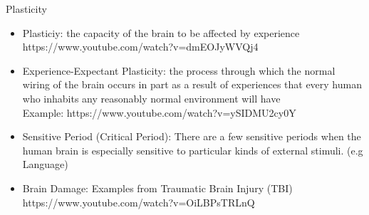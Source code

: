\documentclass{beamer} %
\begin{document}
\begin{frame}{Plasticity}
\begin{itemize}
    \item Plasticiy: the capacity of the brain to be affected by experience
    \\ https://www.youtube.com/watch?v=dmEOJyWVQj4
    \item Experience-Expectant Plasticity: the process through which the normal wiring of the brain occurs in part as a result of experiences that every human who inhabits any reasonably normal environment will have
    \\ Example: https://www.youtube.com/watch?v=ySIDMU2cy0Y
    \item Sensitive Period (Critical Period): There are a few sensitive periods when the human brain is especially sensitive to particular kinds of external stimuli. (e.g Language)
    \item Brain Damage: Examples from Traumatic Brain Injury (TBI) https://www.youtube.com/watch?v=OiLBPsTRLnQ
\end{itemize}
\end{frame}
\end{document}
